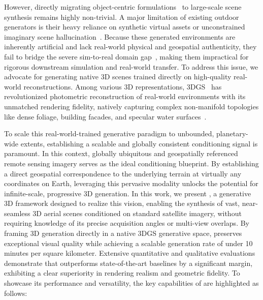 However, directly migrating object-centric formulations~\cite{xiang2025native,xiang2025structured,CLAY,hunyuan3d22025tencent,lai2025hunyuan3d25highfidelity3d,Seed3D} to large-scale scene synthesis remains highly non-trivial. A major limitation of existing outdoor generators is their heavy reliance on synthetic virtual assets or unconstrained imaginary scene hallucination~\cite{Xie_2025_CVPR,CityDreamer,lin2023infinicity,sat2city,sat2scene,earthcrafter}. Because these generated environments are inherently artificial and lack real-world physical and geospatial authenticity, they fail to bridge the severe sim-to-real domain gap~\cite{8202133}, making them impractical for rigorous downstream simulation and real-world transfer. To address this issue, we advocate for generating native 3D scenes trained directly on high-quality real-world reconstructions. Among various 3D representations, 3DGS~\cite{3DGS} has revolutionized photometric reconstruction of real-world environments with its unmatched rendering fidelity, natively capturing complex non-manifold topologies like dense foliage, building facades, and specular water surfaces~\cite{liu2024citygaussian}. 

To scale this real-world-trained generative paradigm to unbounded, planetary-wide extents, establishing a scalable and globally consistent conditioning signal is paramount. In this context, globally ubiquitous and geospatially referenced remote sensing imagery serves as the ideal conditioning blueprint. By establishing a direct geospatial correspondence to the underlying terrain at virtually any coordinates on Earth, leveraging this pervasive modality unlocks the potential for infinite-scale, progressive 3D generation. In this work, we present \method{}, a generative 3D framework designed to realize this vision, enabling the synthesis of vast, near-seamless 3D aerial scenes conditioned on standard satellite imagery, without requiring knowledge of its precise acquisition angles or multi-view overlaps. By framing 3D generation directly in a native 3DGS generative space, \method{} preserves exceptional visual quality while achieving a scalable generation rate of under 10 minutes per square kilometer. Extensive quantitative and qualitative evaluations demonstrate that \method{} outperforms state-of-the-art baselines by a significant margin, exhibiting a clear superiority in rendering realism and geometric fidelity. To showcase its performance and versatility, the key capabilities of \method{} are highlighted as follows:

